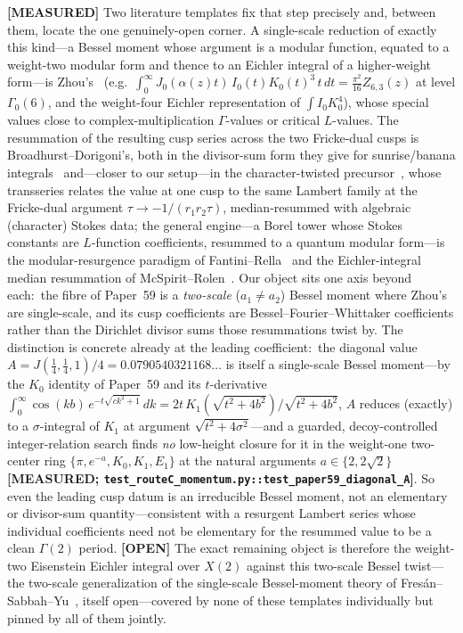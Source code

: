 \documentclass[aps,pra,twocolumn,superscriptaddress,longbibliography]{revtex4-2}
\begin{document}
\textbf{[MEASURED]} Two literature templates fix that step precisely and, between them, locate the
one genuinely-open corner.  A single-scale reduction of exactly this kind---a Bessel moment whose
argument is a modular function, equated to a weight-two modular form and thence to an Eichler
integral of a higher-weight form---is Zhou's~\cite{zhou_wick2018} (e.g.\ $\int_{0}^{\infty}\!
J_{0}(\alpha(z)t)\,I_{0}(t)K_{0}(t)^{3}\,t\,dt=\tfrac{\pi^{2}}{16}Z_{6,3}(z)$ at level
$\Gamma_{0}(6)$, and the weight-four Eichler representation of $\int I_{0}K_{0}^{4}$), whose special
values close to complex-multiplication $\Gamma$-values or critical $L$-values.  The resummation of
the resulting cusp series across the two Fricke-dual cusps is Broadhurst--Dorigoni's, both in the
divisor-sum form they give for sunrise/banana integrals~\cite{broadhurst_dorigoni2026} and---closer
to our setup---in the character-twisted precursor~\cite{broadhurst_dorigoni_characters2025}, whose
transseries relates the value at one cusp to the same Lambert family at the Fricke-dual argument
$\tau\to-1/(r_{1}r_{2}\tau)$, median-resummed with algebraic (character) Stokes data; the general
engine---a Borel tower whose Stokes constants are $L$-function coefficients, resummed to a quantum
modular form---is the modular-resurgence paradigm of Fantini--Rella~\cite{fantini_rella2024} and the
Eichler-integral median resummation of McSpirit--Rolen~\cite{mcspirit_rolen2025}.  Our object sits
one axis beyond each:\ the fibre of Paper~59 is a \emph{two-scale} ($a_{1}\neq a_{2}$)
Bessel moment where Zhou's are single-scale, and its cusp coefficients are Bessel--Fourier--Whittaker
coefficients rather than the Dirichlet divisor sums those resummations twist by.  The distinction is
concrete already at the leading coefficient:\ the diagonal value
$A=J(\tfrac14,\tfrac14,1)/4=0.0790540321168\ldots$ is itself a single-scale Bessel moment---by
the $K_{0}$ identity of Paper~59 and its $t$-derivative $\int_{0}^{\infty}\!\cos(kb)\,e^{-t\sqrt{ck^{2}+1}}\,dk=
2t\,K_{1}(\sqrt{t^{2}+4b^{2}})/\sqrt{t^{2}+4b^{2}}$, $A$ reduces (exactly) to a
$\sigma$-integral of $K_{1}$ at argument $\sqrt{t^{2}+4\sigma^{2}}$---and a guarded, decoy-controlled
integer-relation search finds \emph{no} low-height closure for it in the weight-one two-center ring
$\{\pi,e^{-a},K_{0},K_{1},E_{1}\}$ at the natural arguments $a\in\{2,2\sqrt2\}$
\textbf{[MEASURED; \texttt{test\_routeC\_momentum.py::test\_paper59\_diagonal\_A}]}.  So even the leading cusp datum is an
irreducible Bessel moment, not an elementary or divisor-sum quantity---consistent with a resurgent
Lambert series whose individual coefficients need not be elementary for the resummed value to be a
clean $\Gamma(2)$ period.  \textbf{[OPEN]} The exact remaining object is therefore the weight-two
Eisenstein Eichler integral over $X(2)$ against this two-scale Bessel twist---the two-scale
generalization of the single-scale Bessel-moment theory of
Fres\'an--Sabbah--Yu~\cite{fresansabbahyu2023}, itself open---covered by none of these templates
individually but pinned by all of them jointly.
\end{document}
